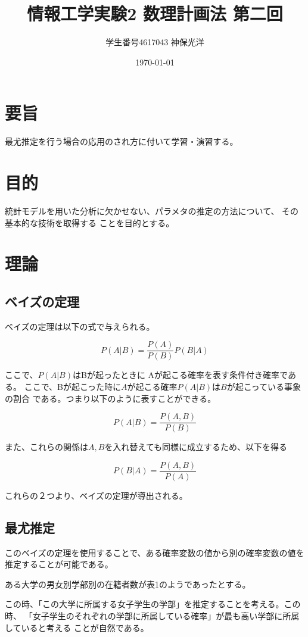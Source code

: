 \documentclass{jsarticle}
\title{情報工学実験2 数理計画法 第二回}
\author{学生番号4617043 神保光洋}
\date{\today}
\begin{document}
\maketitle

\section{要旨}
  最尤推定を行う場合の応用のされ方に付いて学習・演習する。
\section{目的}
  統計モデルを用いた分析に欠かせない、パラメタの推定の方法について、
  その基本的な技術を取得する
  ことを目的とする。
\section{理論}
  \subsection{ベイズの定理}
    ベイズの定理は以下の式で与えられる。

    $$P(A | B) = \frac{P(A)}{P(B)}P(B | A)$$

    ここで、$P(A | B) $はBが起ったときに Aが起こる確率を表す条件付き確率である。
    ここで、Bが起こった時に$A$が起こる確率$P(A | B)$は$B$が起こっている事象の割合
    である。つまり以下のように表すことができる。

    $$P(A | B) = \frac{P(A, B)}{P(B)}$$

    また、これらの関係は$A, B$を入れ替えても同様に成立するため、以下を得る

    $$P(B | A) = \frac{P(A, B)}{P(A)}$$

    これらの２つより、ベイズの定理が導出される。
  \subsection{最尤推定}
    このベイズの定理を使用することで、ある確率変数の値から別の確率変数の値を
    推定することが可能である。

    ある大学の男女別学部別の在籍者数が表1のようであったとする。

    この時、「この大学に所属する女子学生の学部」を推定することを考える。この時、
    「女子学生のそれぞれの学部に所属している確率」が最も高い学部に所属していると考える
    ことが自然である。
\end{document}
